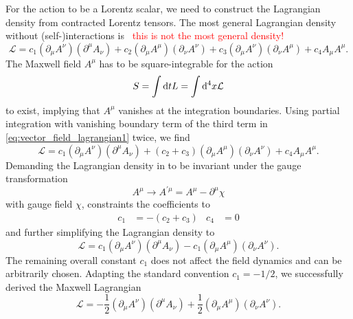 For the action to be a Lorentz scalar, we need to construct the Lagrangian density from contracted Lorentz tensors.
The most general Lagrangian density without (self-)interactions is~\cite{deRham2014}
\textcolor{red}{this is not the most general density!}
\begin{equation}
	\mathcal{L}
	=
	c_1
	\left(
		\partial_\mu
		A^\nu
	\right)
	\left(
		\partial^\mu
		A_\nu
	\right)
	+
	c_2
	\left(
		\partial_\mu
		A^\mu
	\right)
	\left(
		\partial_\nu
		A^\nu
	\right)
	+
	c_3
	\left(
		\partial_\mu
		A^\nu
	\right)
	\left(
		\partial_\nu
		A^\mu
	\right)
	+
	c_4
	A_\mu A^\mu
	\label{eq:vector_field_lagrangian1}
	.
\end{equation}
The Maxwell field $A^\mu$ has to be square-integrable for the action
\begin{equation}
	S
	=
	\int\odif{t}
	L
	=
	\int\odif[order={4}]{x}
	\mathcal{L}
\end{equation}
to exist, implying that $A^\mu$ vanishes at the integration boundaries.
Using partial integration with vanishing boundary term of the third term in \cref{eq:vector_field_lagrangian1} twice, we find
\begin{equation}
	\mathcal{L}
	=
	c_1
	\left(
		\partial_\mu
		A^\nu
	\right)
	\left(
		\partial^\mu
		A_\nu
	\right)
	+
	(c_2+c_3)
	\left(
		\partial_\mu
		A^\mu
	\right)
	\left(
		\partial_\nu
		A^\nu
	\right)
	+
	c_4
	A_\mu A^\mu
	\label{eq:vector_field_lagrangian2}
	.
\end{equation}
Demanding the Lagrangian density in  to be invariant under the gauge transformation
\begin{equation}
	A^\mu
	\to
	A^{\prime\mu}
	=
	A^\mu
	-
	\partial^\mu
	\chi
\end{equation}
with gauge field $\chi$, constraints the coefficients to
\begin{align*}
	c_1
	&=
	-
	(c_2+c_3)
	&
	c_4
	&=
	0
\end{align*}
and further simplifying the Lagrangian density to
\begin{equation}
	\mathcal{L}
	=
	c_1
	\left(
		\partial_\mu
		A^\nu
	\right)
	\left(
		\partial^\mu
		A_\nu
	\right)
	-
	c_1
	\left(
		\partial_\mu
		A^\mu
	\right)
	\left(
		\partial_\nu
		A^\nu
	\right)
	\label{eq:vector_field_lagrangian3}
	.
\end{equation}
The remaining overall constant $c_1$ does not affect the field dynamics and can be arbitrarily chosen.
Adapting the standard convention $c_1=-1/2$, we successfully derived the Maxwell Lagrangian
\begin{equation}
	\mathcal{L}
	=
	-
	\frac{1}{2}
	\left(
		\partial_\mu
		A^\nu
	\right)
	\left(
		\partial^\mu
		A_\nu
	\right)
	+
	\frac{1}{2}
	\left(
		\partial_\mu
		A^\mu
	\right)
	\left(
		\partial_\nu
		A^\nu
	\right)
	.
\end{equation}


